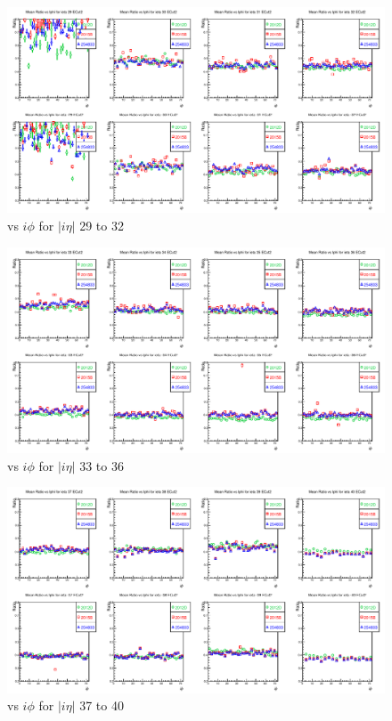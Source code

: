 \begin{figure}[h!]
\centering
\includegraphics[width=0.99\linewidth]{../Figures/Chap2/ImageFiles_HF/2012vs2015/ieta29_32_E1E2Cut2Ietaiphi.pdf}
\caption{\ratiosl vs $i \phi$ for $|i\eta|$ 29 to 32}
\label{fig:ieta29_32_E1E2Cut2Ietaiphi}
\end{figure}
\begin{figure}[h!]
\centering
\includegraphics[width=0.99\linewidth]{../Figures/Chap2/ImageFiles_HF/2012vs2015/ieta33to36E1E2Cut2Ietaiphi.pdf}
\caption{\ratiosl vs $i \phi$ for $|i\eta|$ 33 to 36}
\label{fig:ieta33to36E1E2Cut2Ietaiphi}
\end{figure}
\begin{figure}[h!]
\centering
\includegraphics[width=0.99\linewidth]{../Figures/Chap2/ImageFiles_HF/2012vs2015/ieta37to40E1E2Cut2Ietaiphi.pdf}
\caption{\ratiosl vs $i \phi$ for $|i\eta|$ 37 to 40}
\label{fig:ieta37to40E1E2Cut2Ietaiphi}
\end{figure}
